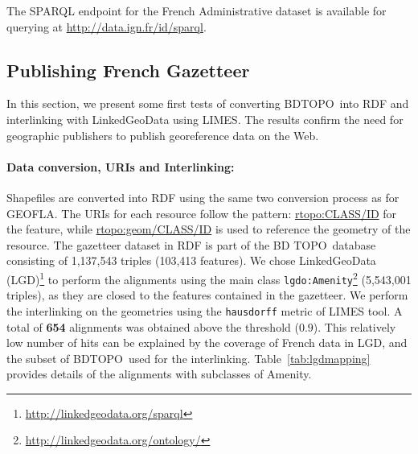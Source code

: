 \begin{table}[!htbp]
\end{table}

The SPARQL endpoint for the French Administrative dataset is available for querying at \url{http://data.ign.fr/id/sparql}.




\subsection{Publishing  French Gazetteer} \label{sec:bdtopo}

In this section, we present some first tests of converting BDTOPO\circledR ~into RDF and interlinking with LinkedGeoData using LIMES. The results confirm the need for geographic publishers to publish georeference data on the Web.

\paragraph{Data conversion, URIs and Interlinking:}
Shapefiles are converted into RDF using the same two conversion process as for GEOFLA\circledR. The URIs for each resource follow the pattern: \url{rtopo:CLASS/ID} for the feature, while  \url{rtopo:geom/CLASS/ID} is used to reference the geometry of the resource.
The gazetteer dataset in RDF is part of the BD TOPO\circledR ~database consisting of  1,137,543 triples (103,413 features). We chose LinkedGeoData (LGD)\footnote{\url{http://linkedgeodata.org/sparql}} to perform the alignments using the main class \texttt{lgdo:Amenity}\footnote{\url{http://linkedgeodata.org/ontology/}} (5,543,001 triples), as they are closed to the features contained in the gazetteer. We perform the interlinking on the geometries using the \texttt{hausdorff} metric of LIMES tool. A total of \textbf{654} alignments was obtained above the threshold ($0.9$). This relatively low number of hits can be explained by the coverage of French data in LGD, and the subset of BDTOPO\circledR  ~used for the interlinking. Table~\ref{tab:lgdmapping} provides details of the alignments with subclasses of Amenity.

